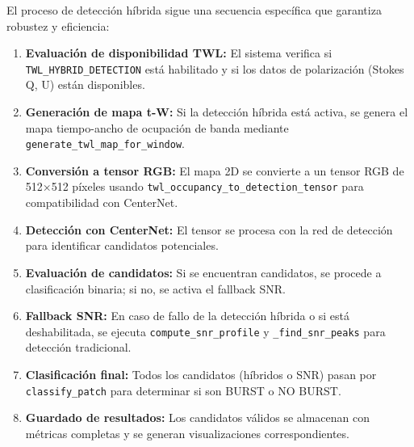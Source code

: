 El proceso de detección híbrida sigue una secuencia específica que garantiza robustez y eficiencia:

\begin{enumerate}
\item \textbf{Evaluación de disponibilidad TWL:} El sistema verifica si \texttt{TWL\_HYBRID\_DETECTION} está habilitado y si los datos de polarización (Stokes Q, U) están disponibles.
\item \textbf{Generación de mapa t-W:} Si la detección híbrida está activa, se genera el mapa tiempo-ancho de ocupación de banda mediante \texttt{generate\_twl\_map\_for\_window}.
\item \textbf{Conversión a tensor RGB:} El mapa 2D se convierte a un tensor RGB de 512×512 píxeles usando \texttt{twl\_occupancy\_to\_detection\_tensor} para compatibilidad con CenterNet.
\item \textbf{Detección con CenterNet:} El tensor se procesa con la red de detección para identificar candidatos potenciales.
\item \textbf{Evaluación de candidatos:} Si se encuentran candidatos, se procede a clasificación binaria; si no, se activa el fallback SNR.
\item \textbf{Fallback SNR:} En caso de fallo de la detección híbrida o si está deshabilitada, se ejecuta \texttt{compute\_snr\_profile} y \texttt{\_find\_snr\_peaks} para detección tradicional.
\item \textbf{Clasificación final:} Todos los candidatos (híbridos o SNR) pasan por \texttt{classify\_patch} para determinar si son BURST o NO BURST.
\item \textbf{Guardado de resultados:} Los candidatos válidos se almacenan con métricas completas y se generan visualizaciones correspondientes.
\end{enumerate}

